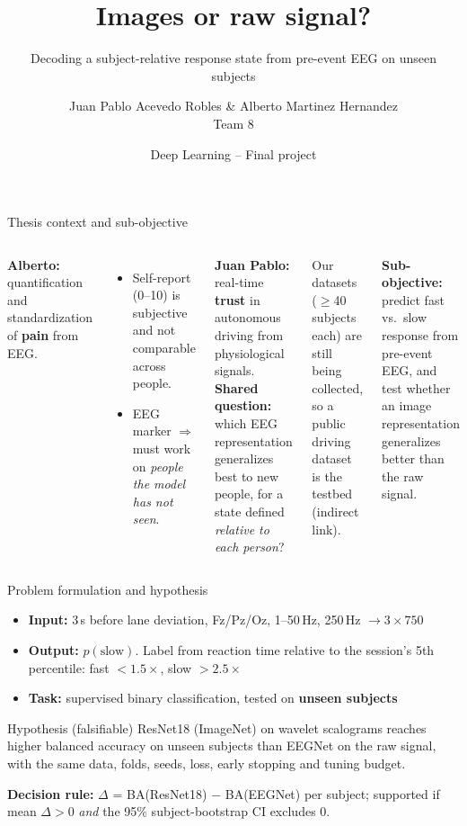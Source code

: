 \documentclass[aspectratio=169,11pt]{beamer}
\title{Images or raw signal?}
\subtitle{Decoding a subject-relative response state from pre-event EEG on unseen subjects}
\author{Juan Pablo Acevedo Robles \& Alberto Martinez Hernandez\\[2pt] Team 8}
\date{Deep Learning -- Final project}
\begin{document}
\begin{frame}
\titlepage
\end{frame}

\begin{frame}{Thesis context and sub-objective}
\begin{columns}[T]
\textbf{Alberto:} quantification and standardization of \textbf{pain} from EEG.
\begin{itemize}\small
\item Self-report (0--10) is subjective and not comparable across people.
\item EEG marker $\Rightarrow$ must work on \emph{people the model has not seen}.
\end{itemize}
\textbf{Juan Pablo:} real-time \textbf{trust} in autonomous driving from physiological signals.
\textbf{Shared question:} which EEG representation generalizes best to new people, for a state defined \emph{relative to each person}?

\medskip
Our datasets ($\geq$40 subjects each) are still being collected, so a public driving dataset is the testbed (indirect link).

\medskip
\textbf{Sub-objective:} predict fast vs.\ slow response from pre-event EEG, and test whether an image representation generalizes better than the raw signal.
\end{columns}
\end{frame}

\begin{frame}{Problem formulation and hypothesis}
\begin{itemize}
\item \textbf{Input:} 3\,s before lane deviation, Fz/Pz/Oz, 1--50\,Hz, 250\,Hz $\rightarrow 3\times750$
\item \textbf{Output:} $p(\text{slow})$. Label from reaction time relative to the session's 5th percentile: fast $<1.5\times$, slow $>2.5\times$
\item \textbf{Task:} supervised binary classification, tested on \textbf{unseen subjects}
\end{itemize}
\begin{block}{Hypothesis (falsifiable)}
ResNet18 (ImageNet) on wavelet scalograms reaches higher balanced accuracy on unseen subjects than EEGNet on the raw signal, with the same data, folds, seeds, loss, early stopping and tuning budget.
\end{block}
\textbf{Decision rule:} $\Delta$ = BA(ResNet18) $-$ BA(EEGNet) per subject; supported if mean $\Delta>0$ \emph{and} the 95\% subject-bootstrap CI excludes 0.
\end{frame}
\end{document}
